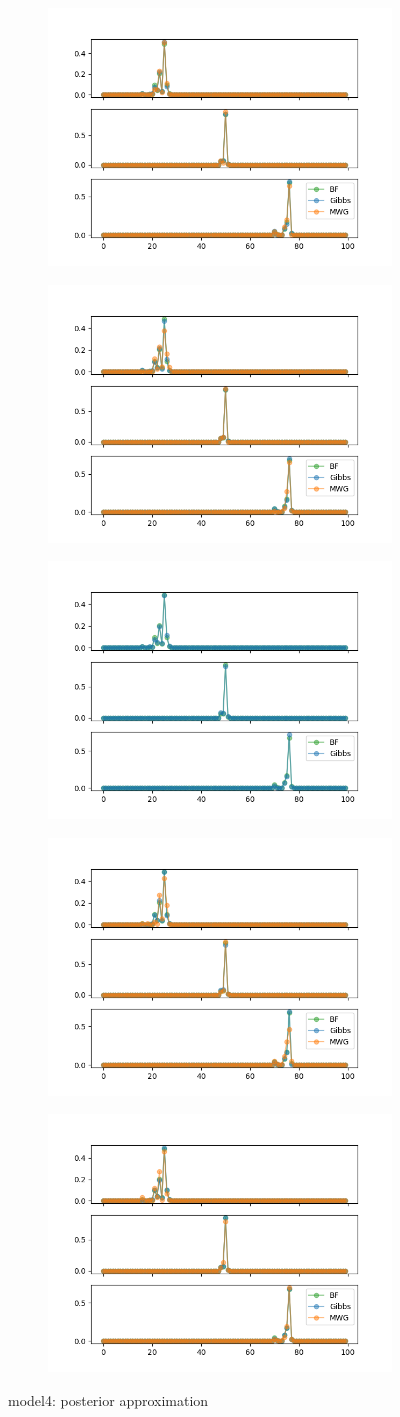 \begin{figure}[H]
    \centering
    \begin{subfigure}
    	\centering
        \includegraphics[width=0.3\linewidth]{../../plots/Posterior_post_burnin_M4_N100_NMCMC3_seed0_diffind2.png}
    \end{subfigure}
    \begin{subfigure}
        \centering
    	\includegraphics[width=0.3\linewidth]{../../plots/Posterior_post_burnin_M4_N100_NMCMC3_seed1_diffind2.png}
	\end{subfigure}
	\begin{subfigure}
	    \centering
    	\includegraphics[width=0.3\linewidth]{../../plots/Posterior_post_burnin_M4_N100_NMCMC3_seed2_diffind2.png}
	\end{subfigure}
	\begin{subfigure}
	    \centering
    	\includegraphics[width=0.3\linewidth]{../../plots/Posterior_post_burnin_M4_N100_NMCMC3_seed3_diffind2.png}
	\end{subfigure}
	\begin{subfigure}
	    \centering
    	\includegraphics[width=0.3\linewidth]{../../plots/Posterior_post_burnin_M4_N100_NMCMC3_seed4_diffind2.png}
	\end{subfigure}
	\caption{model4: posterior approximation}
\end{figure}

